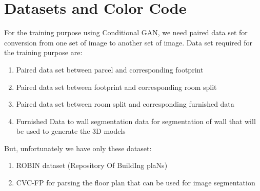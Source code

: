         \section{Datasets and Color Code}
                For the training purpose using Conditional GAN, we need paired data set for conversion from one set of image to another set of image. Data set required for the training purpose are:
                \begin{enumerate}[label=\alph*.]
                        \item Paired data set between parcel and corresponding footprint
                        \item Paired data set between footprint and corresponding room split
                        \item Paired data set between room split and corresponding furnished data 
                        \item Furnished Data to wall segmentation data for segmentation of wall that will be used to generate the 3D models
                \end{enumerate}
                But, unfortunately we have only these dataset: 
                \begin{enumerate}[label=\alph*.]
                        \item ROBIN dataset\cite{chattopadhyay_2021} (Repository Of BuildIng plaNs)
                        \item CVC-FP\cite{de2015cvc} for parsing the floor plan that can be used for image segmentation
                \end{enumerate}
                \break
